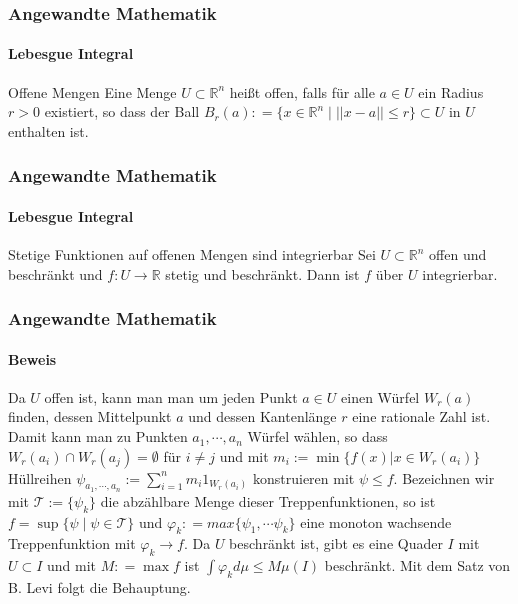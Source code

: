 \documentclass{beamer}
\begin{document}
\begin{frame}
    \frametitle{Angewandte Mathematik}
\framesubtitle{Lebesgue Integral}
    \begin{block}{Offene Mengen}
Eine Menge $U \subset \mathbb{R}^n$ heißt offen, falls für alle $a \in U$ ein Radius $r >0$ existiert, so dass der Ball $B_r(a) : = \{ x \in \mathbb{R}^n \; | \; ||x -a|| \leq r \} \subset U$ in $U$ enthalten ist.
\end{block}

 \end{frame}

\begin{frame}
    \frametitle{Angewandte Mathematik}
\framesubtitle{Lebesgue Integral}
    \begin{block}{Stetige Funktionen auf offenen Mengen sind integrierbar}
Sei $U \subset \mathbb{R}^n$ offen und beschränkt und $f : U \to \mathbb{R}$ stetig und beschränkt. Dann ist $f$ über $U$ integrierbar.
\end{block}

 \end{frame}





\begin{frame}
    \frametitle{Angewandte Mathematik}
\framesubtitle{Beweis}
Da $U$ offen ist, kann man man um jeden Punkt $a \in U$ einen Würfel $W_r(a)$ finden, dessen Mittelpunkt $a$  und dessen Kantenlänge $r$ eine rationale Zahl ist. Damit kann man zu Punkten $a_1, \cdots,  a_n$ Würfel wählen, so dass $W_r(a_i) \cap W_r(a_j) = \emptyset$ für $i \neq j$ und mit $m_i := \min \{ f(x)  | x \in W_r(a_i) \} $ Hüllreihen   $\psi_{a_1, \cdots, a_n} := \sum_{i=1}^n m_i 1_{W_r(a_i)} $  konstruieren mit  $\psi \leq f$. Bezeichnen  wir mit $\mathcal{T} :=  \{ \psi_k  \}$ die abzählbare Menge dieser Treppenfunktionen, so ist $f = \sup \{ \psi \; | \; \psi \in \mathcal{T}  \}$ und $\varphi_k : = max \{ \psi_1, \cdots \psi_k  \}$ eine monoton wachsende Treppenfunktion mit $\varphi_k \to f$. Da $U$ beschränkt ist, gibt es eine Quader $I$ mit $U \subset I$ und mit $M : = \max f$  ist $\int \varphi_k d \mu \leq M \mu(I)$ beschränkt. Mit dem Satz von B. Levi folgt die Behauptung.
 \end{frame}
\end{document}
